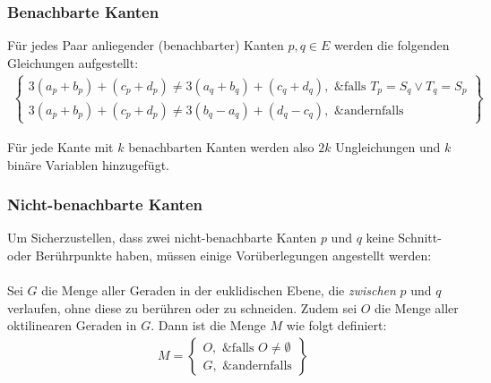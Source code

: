 \documentclass[a4paper,11pt]{amsart}
\begin{document}
\subsubsection*{Benachbarte Kanten} Für jedes Paar anliegender (benachbarter) Kanten $p, q \in E$ werden die folgenden Gleichungen aufgestellt:
\bigskip
\begin{gather*}
\left\{\begin{array}{lr}
    3 (a_p + b_p) + (c_p + d_p) \ne 3 (a_q + b_q) + (c_q + d_q), \text{ &falls } T_p = S_q \lor T_q = S_p \\
    3 (a_p + b_p) + (c_p + d_p) \ne 3 (b_q - a_q) + (d_q - c_q), \text{ &andernfalls}
\end{array}\right\}
\end{gather*}

\bigskip
\noindent Für jede Kante mit $k$ benachbarten Kanten werden also $2k$ Ungleichungen und $k$ binäre Variablen hinzugefügt.

\subsubsection*{Nicht-benachbarte Kanten}

Um Sicherzustellen, dass zwei nicht-benachbarte Kanten $p$ und $q$ keine Schnitt- oder Berührpunkte haben, müssen einige Vorüberlegungen angestellt werden:\\\\
Sei $G$ die Menge aller Geraden in der euklidischen Ebene, die \textit{zwischen} $p$ und $q$ verlaufen, ohne diese zu berühren oder zu schneiden. Zudem sei $O$ die Menge aller oktilinearen Geraden in $G$. Dann ist die Menge $M$ wie folgt definiert:
\bigskip
\begin{gather*}
M = \left\{\begin{array}{lr}
    O, \text{ &falls } O \ne \emptyset \\
    G, \text{ &andernfalls}
\end{array}\right\}
\end{gather*}
\end{document}
